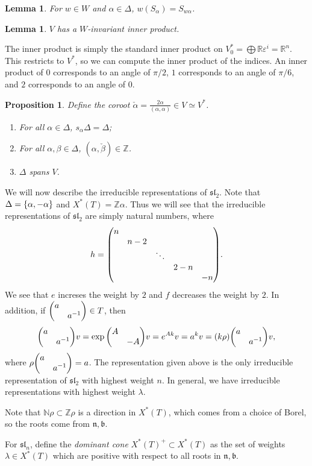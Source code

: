 \documentclass[leqno, openany]{memoir}
\newtheorem{prop}[thm]{Proposition}
\newtheorem{lem}[thm]{Lemma}
\theoremstyle{definition}
\theoremstyle{remark}
\theoremstyle{plain}
\theoremstyle{definition}
\theoremstyle{remark}
\newcommand{\R}{\mathbb{R}}
\newcommand{\Z}{\mathbb{Z}}
\newcommand{\ep}{\varepsilon}
\newcommand{\mf}[1]{\mathfrak{#1}}
\newcommand{\mb}[1]{\mathbb{#1}}
\begin{document}
\begin{lem} For $w \in W$ and $\alpha \in \Delta$, $w(S_{\alpha}) =
S_{w\alpha}$.  \end{lem}

\begin{lem} $V$ has a $W$-invariant inner product.  \end{lem}

The inner product is simply the standard inner product on $V_0^* = \bigoplus \R
\ep^i = \R^n$. This restricts to $V^*$, so we can compute the inner product of
the indices. An inner product of $0$ corresponds to an angle of $\pi/2$, $1$
corresponds to an angle of $\pi/6$, and $2$ corresponds to an angle of $0$.

\begin{prop} Define the coroot $\check{\alpha} = \frac{2 \alpha}{(\alpha,
    \alpha)} \in V \simeq V^*$.  \begin{enumerate} \item For all $\alpha \in
        \Delta$, $s_{\alpha} \Delta = \Delta$; \item For all $\alpha, \beta \in
        \Delta$, $(\alpha, \check{\beta}) \in \Z$.  \item $\Delta$ spans $V$.
\end{enumerate} \end{prop}

We will now describe the irreducible representations of $\mf{sl}_2$. Note that
$\Delta = \qty{\alpha, -\alpha}$ and $X^*(T) = \Z \alpha$. Thus we will see
that the irreducible representations of $\mf{sl}_2$ are simply natural numbers,
where \[ h = \mqty(\dmat{n,n-2,\ddots,2-n,-n}). \] We see that $e$ increses the
weight by $2$ and $f$ decreases the weight by $2$. In addition, if
$\mqty(\dmat{a,a^{-1}}) \in T$, then \[ \mqty(\dmat{a,a^{-1}}) v = \exp
\mqty(\dmat{A,-A}) v = e^{Ak} v = a^k v = (k\rho) \mqty(\dmat{a,a^{-1}}) v, \]
where $\rho \mqty(\dmat{a,a^{-1}}) = a$. The representation given above is the
only irreducible representation of $\mf{sl}_2$ with highest weight $n$. In
general, we have irreducible representations with highest weight $\lambda$.

Note that $\mb{N} \rho \subset \Z \rho$ is a direction in $X^*(T)$, which comes
from a choice of Borel, so the roots come from $\mf{n}, \mf{b}$.

For $\mf{sl}_n$, define the \textit{dominant cone} $X^*(T)^+ \subset X^*(T)$ as
the set of weights $\lambda \in X^*(T)$ which are positive with respect to all
roots in $\mf{n}, \mf{b}$.
\end{document}
